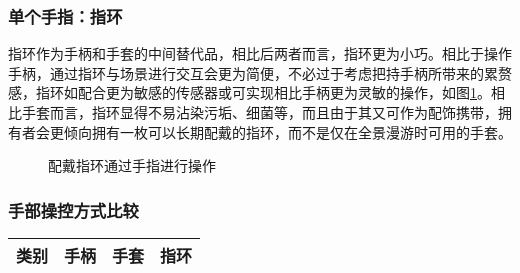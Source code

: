\subsubsection{单个手指：指环}
指环作为手柄和手套的中间替代品，相比后两者而言，指环更为小巧。相比于操作手柄，通过指环与场景进行交互会更为简便，不必过于考虑把持手柄所带来的累赘感，指环如配合更为敏感的传感器或可实现相比手柄更为灵敏的操作，如图\ref{fig:ring}。相比手套而言，指环显得不易沾染污垢、细菌等，而且由于其又可作为配饰携带，拥有者会更倾向拥有一枚可以长期配戴的指环，而不是仅在全景漫游时可用的手套。


\begin{figure}[htp]
\centering
{}
\caption{配戴指环通过手指进行操作}
\label{fig:ring}
\end{figure}

\subsubsection{手部操控方式比较}

\begin{tabular}{|l|l|l|l|}
\hline
类别 & 手柄 & 手套 & 指环 \\
\hline
\end{tabular}
